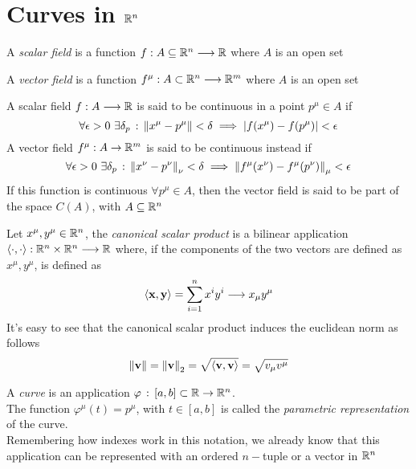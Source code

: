 \documentclass[../complete.tex]{subfiles}
\begin{document}
\section{Curves in $\R^n$}
\begin{dfn}
	A \textit{scalar field} is a function $f:A\subseteq\mathbb{R}^n\overset{}{\longrightarrow}\mathbb{R}$ where $A$ is an open set
\end{dfn}
\begin{dfn}
	A \textit{vector field} is a function $f^\mu:A\subset\mathbb{R}^n\overset{}{\longrightarrow}\mathbb{R}^m$ where $A$ is an open set
\end{dfn}
\begin{dfn}[Continuity]
	A scalar field $f:A\overset{}{\longrightarrow}\mathbb{R}$ is said to be continuous in a point $p^\mu\in A$ if
	\begin{equation}
		\forall\epsilon>0\ \exists\delta_p\st\norm{x^\mu-p^\mu}<\delta\implies\abs{f(x^\mu)-f(p^\mu)}<\epsilon
		\label{eq:scalarfieldcont}
	\end{equation}
	A vector field $f^\mu:A\to\mathbb{R}^m$ is said to be continuous instead if
	\begin{equation}
		\forall\epsilon>0\ \exists\delta_{p}\st\norm{x^\nu-p^\nu}_\nu<\delta\implies\norm{f^\mu(x^\nu)-f^\mu(p^\nu)}_\mu<\epsilon
		\label{eq:vecfieldcont}
	\end{equation}
	If this function is continuous $\forall p^\mu\in A$, then the vector field is said to be part of the space $C(A)$, with $A\subseteq\mathbb{R}^n$
\end{dfn}
\begin{dfn}
	Let $x^\mu,y^\mu\in\mathbb{R}^n$, the \textit{canonical scalar product} is a bilinear application $\langle \cdot, \cdot \rangle:\mathbb{R}^n\times\mathbb{R}^n\overset{}{\longrightarrow}\mathbb{R}$ where, if the components of the two vectors are defined as $x^\mu,y^\mu$, is defined as
	\begin{equation}
		\spr{\vec{x}}{\vec{y}}=\sum_{i=1}^nx^iy^i\fto x_\mu y^\mu
		\label{eq:scalarprod}
	\end{equation}
	It's easy to see that the canonical scalar product induces the euclidean norm as follows
	\begin{equation}
		\norm{\vec{v}}=\pnorm[2]{\vec{v}}=\sqrt{\spr{\vec{v}}{\vec{v}}}=\sqrt{v_\mu v^\mu}
		\label{eq:euclideannorm}
	\end{equation}
\end{dfn}
\begin{dfn}[Curves in $\R^n$]
	A \textit{curve} is an application $\varphi\, :\, [a,b]\subset\mathbb{R}\to\mathbb{R}^n$.\\
	The function $\varphi^\mu(t)=p^\mu$, with $t\in[a,b]$ is called the \textit{parametric representation} of the curve.\\
	Remembering how indexes work in this notation, we already know that this application can be represented with an ordered $n-$tuple or a vector in $\R^n$
\end{dfn}
\end{document}

